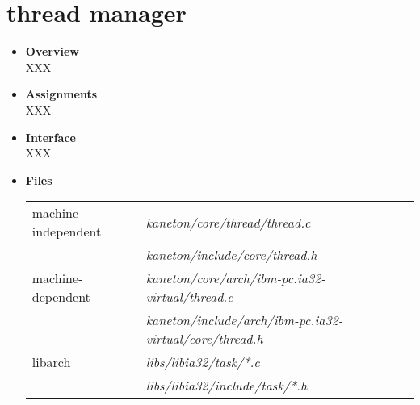 \section{\textbf{thread} manager}
\begin{itemize}
  \item {\bf Overview}\\

    XXX

  \item {\bf Assignments}\\

    XXX

  \item {\bf Interface}\\

    XXX

  \item {\bf Files}\\

    \begin{tabular}{| l | l |}
      \hline
      machine-independent & {\em kaneton/core/thread/thread.c}\\
      &  {\em kaneton/include/core/thread.h}\\\hline
      machine-dependent & {\em kaneton/core/arch/ibm-pc.ia32-virtual/thread.c}\\
      & {\em kaneton/include/arch/ibm-pc.ia32-virtual/core/thread.h}\\\hline
      libarch & {\em libs/libia32/task/*.c}\\
      &  {\em libs/libia32/include/task/*.h}\\\hline
    \end{tabular}

\end{itemize}


%
%

\newpage

